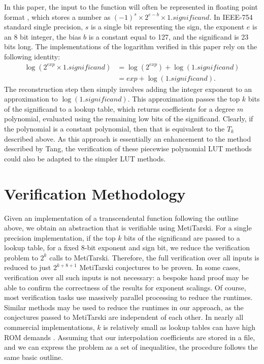 \documentclass{fac}
\begin{document}
In this paper, the input to the function will often be represented in floating point format \cite{goldberg1991every}, which stores a number as $(-1)^{s} \times 2^{e-b} \times 1.\textit{significand}$. In IEEE-754 standard single precision, $s$ is a single bit representing the sign, the exponent $e$ is an 8 bit integer, the bias $b$ is a constant equal to 127, and the significand is 23 bits long. The implementations of the logarithm verified in this paper rely on the following identity:
\begin{align*}
    \log(2^{\textit{exp}} \times 1.\textit{significand}) &= \log(2^{\textit{exp}}) + \log(1.\textit{significand}) \\
                                                &= \textit{exp} + \log(1.\textit{significand}).
\end{align*}
The reconstruction step then simply involves adding the integer exponent to an approximation to $\log(1.\textit{significand})$. This approximation passes the top $k$ bits of the significand to a lookup table, which returns coefficients for a degree $m$ polynomial, evaluated using the remaining low bits of the significand. Clearly, if the polynomial is a constant polynomial, then that is equivalent to the $T_k$ described above. As this approach is essentially an enhancement to the method described by Tang, the verification of these piecewise polynomial LUT methods could also be adapted to the simpler LUT methods.


\section{Verification Methodology}
\label{Method}
Given an implementation of a transcendental function following the outline above, we obtain an abstraction that is verifiable using MetiTarski. For a single precision implementation, if the top $k$ bits of the significand are passed to a lookup table, for a fixed 8-bit exponent and sign bit, we reduce the verification problem to $2^k$ calls to MetiTarski. Therefore, the  full verification over all inputs is reduced to just $2^{k+8+1}$ MetiTarski conjectures to be proven. In some cases, verification over all such inputs is not necessary: a bespoke hand proof may be able to confirm the correctness of the results for exponent scalings. Of course, most verification tasks use massively parallel processing to reduce the runtimes. Similar methods may be used to reduce the runtimes in our approach, as the conjectures passed to MetiTarski are independent of each other. In nearly all commercial implementations, $k$ is relatively small as lookup tables can have high ROM demands \cite{strollo2011elementary}. Assuming that our interpolation coefficients are stored in a file, and we can express the problem as a set of inequalities, the procedure follows the same basic outline. \\
\end{document}
